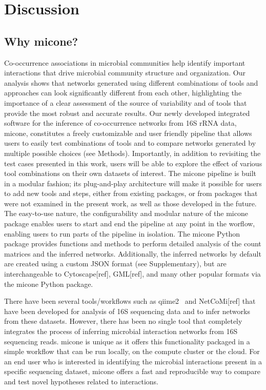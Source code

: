
\section*{Discussion}

  \subsection*{Why \ac{micone}?}

  Co-occurrence associations in microbial communities help identify important interactions that drive microbial community structure and organization.
  Our analysis shows that networks generated using different combinations of tools and approaches can look significantly different from each other, highlighting the importance of a clear assessment of the source of variability and of tools that provide the most robust and accurate results.
  Our newly developed integrated software for the inference of co-occurrence networks from 16S rRNA data, \ac{micone}, constitutes a freely customizable and user friendly pipeline that allows users to easily test combinations of tools and to compare networks generated by multiple possible choices (see Methods).
  Importantly, in addition to revisiting the test cases presented in this work, users will be able to explore the effect of various tool combinations on their own datasets of interest.
  The \ac{micone} pipeline is built in a modular fashion; its plug-and-play architecture will make it possible for users to add new tools and steps, either from existing packages, or from packages that were not examined in the present work, as well as those developed in the future.
  The easy-to-use nature, the configurability and modular nature of the \ac{micone} package enables users to start and end the pipeline at any point in the worflow, enabling users to run parts of the pipeline in isolation.
  The \ac{micone} Python package provides functions and methods to perform detailed analysis of the count matrices and the inferred networks.
  Additionally, the inferred networks by default are created using a custom JSON format (see Supplementary), but are interchangeable to Cytoscape[ref], GML[ref], and many other popular formats via the \ac{micone} Python package.

  There have been several tools/workflows such as \ac{qiime2}~\cite{bolyenReproducibleInteractiveScalable2019} and NetCoMi[ref] that have been developed for analysis of 16S sequencing data and to infer networks from these datasets.
  However, there has been no single tool that completely integrates the process of inferring microbial interaction networks from 16S sequencing reads.
  \ac{micone} is unique as it offers this functionality packaged in a simple workflow that can be run locally, on the compute cluster or the cloud.
  For an end user who is interested in identifying the microbial interactions present in a specific sequencing dataset, \ac{micone} offers a fast and reproducible way to compare and test novel hypotheses related to interactions.

